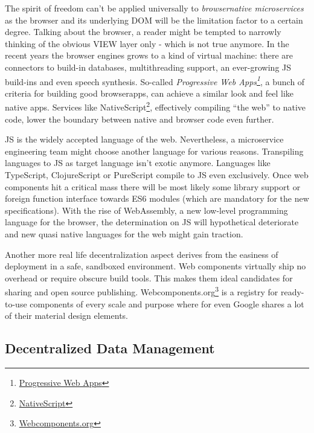 \documentclass[]{article}
\begin{document}
The spirit of freedom can't be applied universally to
\emph{browsernative microservices} as the browser and its underlying DOM
will be the limitation factor to a certain degree. Talking about the
browser, a reader might be tempted to narrowly thinking of the obvious
VIEW layer only - which is not true anymore. In the recent years the
browser engines grows to a kind of virtual machine: there are connectors
to build-in databases, multithreading support, an ever-growing JS
build-ins and even speech synthesis. So-called \emph{Progressive Web
Apps\footnote{\href{https://developers.google.com/web/progressive-web-apps}{Progressive
  Web Apps}}}, a bunch of criteria for building good browserapps, can
achieve a similar look and feel like native apps. Services like
NativeScript\footnote{\href{https://www.nativescript.org}{NativeScript}},
effectively compiling ``the web'' to native code, lower the boundary
between native and browser code even further.

JS is the widely accepted language of the web. Nevertheless, a
microservice engineering team might choose another language for various
reasons. Transpiling languages to JS as target language isn't exotic
anymore. Languages like TypeScript, ClojureScript or PureScript compile
to JS even exclusively. Once web components hit a critical mass there
will be most likely some library support or foreign function interface
towards ES6 modules (which are mandatory for the new specifications).
With the rise of WebAssembly, a new low-level programming language for
the browser, the determination on JS will hypothetical deteriorate and
new quasi native languages for the web might gain traction.

Another more real life decentralization aspect derives from the easiness
of deployment in a safe, sandboxed environment. Web components virtually
ship no overhead or require obscure build tools. This makes them ideal
candidates for sharing and open source publishing.
Webcomponents.org\footnote{\href{https://webcomponents.org}{Webcomponents.org}}
is a registry for ready-to-use components of every scale and purpose
where for even Google shares a lot of their material design elements.

\subsection{Decentralized Data
Management}\label{decentralized-data-management}
\end{document}
